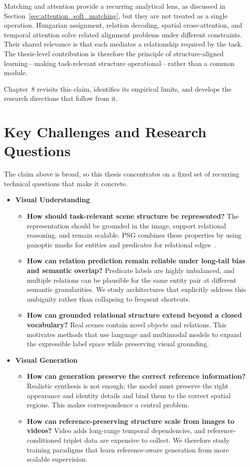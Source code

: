 Matching and attention provide a recurring analytical lens, as discussed in Section~\ref{sec:attention_soft_matching}, but they are not treated as a single operation. Hungarian assignment, relation decoding, spatial cross-attention, and temporal attention solve related alignment problems under different constraints. Their shared relevance is that each mediates a relationship required by the task. The thesis-level contribution is therefore the principle of structure-aligned learning---making task-relevant structure operational---rather than a common module.

Chapter~8 revisits this claim, identifies its empirical limits, and develops the research directions that follow from it.

\section{Key Challenges and Research Questions}
The claim above is broad, so this thesis concentrates on a fixed set of recurring technical questions that make it concrete.
\begin{itemize}
    \item \textbf{Visual Understanding}
    \begin{itemize}
        \item \textbf{How should task-relevant scene structure be represented?} The representation should be grounded in the image, support relational reasoning, and remain scalable. PSG combines these properties by using panoptic masks for entities and predicates for relational edges~\citep{yang2022panoptic}.
        \item \textbf{How can relation prediction remain reliable under long-tail bias and semantic overlap?} Predicate labels are highly imbalanced, and multiple relations can be plausible for the same entity pair at different semantic granularities. We study architectures that explicitly address this ambiguity rather than collapsing to frequent shortcuts.
        \item \textbf{How can grounded relational structure extend beyond a closed vocabulary?} Real scenes contain novel objects and relations. This motivates methods that use language and multimodal models to expand the expressible label space while preserving visual grounding.
    \end{itemize}
    \item \textbf{Visual Generation}
    \begin{itemize}
        \item \textbf{How can generation preserve the correct reference information?} Realistic synthesis is not enough; the model must preserve the right appearance and identity details and bind them to the correct spatial regions. This makes correspondence a central problem.
        \item \textbf{How can reference-preserving structure scale from images to videos?} Video adds long-range temporal dependencies, and reference-conditioned triplet data are expensive to collect. We therefore study training paradigms that learn reference-aware generation from more scalable supervision.
    \end{itemize}
\end{itemize}
